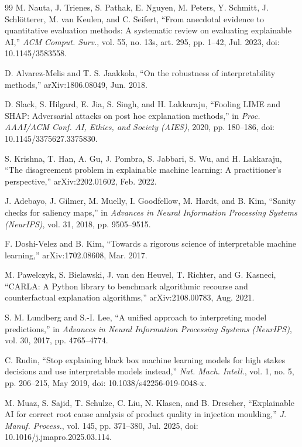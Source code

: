 \documentclass[11pt,a4paper]{article}
\begin{document}
\begin{thebibliography}{99}
 M. Nauta, J. Trienes, S. Pathak, E. Nguyen, M. Peters, Y. Schmitt, J. Schl\"{o}tterer, M. van Keulen, and C. Seifert, ``From anecdotal evidence to quantitative evaluation methods: A systematic review on evaluating explainable AI,'' \emph{ACM Comput. Surv.}, vol. 55, no. 13s, art. 295, pp. 1--42, Jul. 2023, doi: 10.1145/3583558.

 D. Alvarez-Melis and T. S. Jaakkola, ``On the robustness of interpretability methods,'' arXiv:1806.08049, Jun. 2018.

 D. Slack, S. Hilgard, E. Jia, S. Singh, and H. Lakkaraju, ``Fooling LIME and SHAP: Adversarial attacks on post hoc explanation methods,'' in \emph{Proc. AAAI/ACM Conf. AI, Ethics, and Society (AIES)}, 2020, pp. 180--186, doi: 10.1145/3375627.3375830.

 S. Krishna, T. Han, A. Gu, J. Pombra, S. Jabbari, S. Wu, and H. Lakkaraju, ``The disagreement problem in explainable machine learning: A practitioner's perspective,'' arXiv:2202.01602, Feb. 2022.

 J. Adebayo, J. Gilmer, M. Muelly, I. Goodfellow, M. Hardt, and B. Kim, ``Sanity checks for saliency maps,'' in \emph{Advances in Neural Information Processing Systems (NeurIPS)}, vol. 31, 2018, pp. 9505--9515.

 F. Doshi-Velez and B. Kim, ``Towards a rigorous science of interpretable machine learning,'' arXiv:1702.08608, Mar. 2017.

 M. Pawelczyk, S. Bielawski, J. van den Heuvel, T. Richter, and G. Kasneci, ``CARLA: A Python library to benchmark algorithmic recourse and counterfactual explanation algorithms,'' arXiv:2108.00783, Aug. 2021.

 S. M. Lundberg and S.-I. Lee, ``A unified approach to interpreting model predictions,'' in \emph{Advances in Neural Information Processing Systems (NeurIPS)}, vol. 30, 2017, pp. 4765--4774.

 C. Rudin, ``Stop explaining black box machine learning models for high stakes decisions and use interpretable models instead,'' \emph{Nat. Mach. Intell.}, vol. 1, no. 5, pp. 206--215, May 2019, doi: 10.1038/s42256-019-0048-x.

 M. Muaz, S. Sajid, T. Schulze, C. Liu, N. Klasen, and B. Drescher, ``Explainable AI for correct root cause analysis of product quality in injection moulding,'' \emph{J. Manuf. Process.}, vol. 145, pp. 371--380, Jul. 2025, doi: 10.1016/j.jmapro.2025.03.114.


\end{thebibliography}
\end{document}
